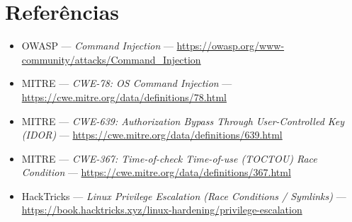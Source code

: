 \documentclass[12pt,a4paper]{article}
\begin{document}
\section{Referências}
\begin{itemize}[leftmargin=1.5em]
  \item OWASP --- \emph{Command Injection} ---
        \url{https://owasp.org/www-community/attacks/Command_Injection}
  \item MITRE --- \emph{CWE-78: OS Command Injection} ---
        \url{https://cwe.mitre.org/data/definitions/78.html}
  \item MITRE --- \emph{CWE-639: Authorization Bypass Through User-Controlled Key (IDOR)} ---
        \url{https://cwe.mitre.org/data/definitions/639.html}
  \item MITRE --- \emph{CWE-367: Time-of-check Time-of-use (TOCTOU) Race Condition} ---
        \url{https://cwe.mitre.org/data/definitions/367.html}
  \item HackTricks --- \emph{Linux Privilege Escalation (Race Conditions / Symlinks)} ---
        \url{https://book.hacktricks.xyz/linux-hardening/privilege-escalation}
\end{itemize}
\end{document}
